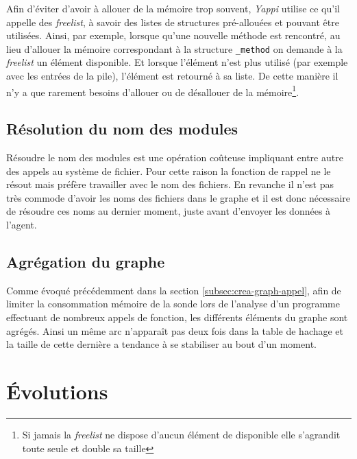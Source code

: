 \begin{note}[freelist]
Afin d'éviter d'avoir à allouer de la mémoire trop souvent, \emph{Yappi} utilise ce qu'il appelle des \emph{freelist}, à savoir des listes de structures pré-allouées et pouvant être utilisées. Ainsi, par exemple, lorsque qu'une nouvelle méthode est rencontré, au lieu d'allouer la mémoire correspondant à la structure \verb|_method| on demande à la \emph{freelist} un élément disponible. Et lorsque l'élément n'est plus utilisé (par exemple avec les entrées de la pile), l'élément est retourné à sa liste. De cette manière il n'y a que rarement besoins d'allouer ou de désallouer de la mémoire\footnote{Si jamais la \emph{freelist} ne dispose d'aucun élément de disponible elle s'agrandit toute seule et double sa taille}.
\end{note}

\subsection{Résolution du nom des modules}
Résoudre le nom des modules est une opération coûteuse impliquant entre autre des appels au système de fichier. Pour cette raison la fonction de rappel ne le résout mais préfère travailler avec le nom des fichiers. En revanche il n'est pas très commode d'avoir les noms des fichiers dans le graphe et il est donc nécessaire de résoudre ces noms au dernier moment, juste avant d'envoyer les données à l'agent.

\subsection{Agrégation du graphe}
Comme évoqué précédemment dans la section \vref{subsec:crea-graph-appel}, afin de limiter la consommation mémoire de la sonde lors de l'analyse d'un programme effectuant de nombreux appels de fonction, les différents éléments du graphe sont agrégés. Ainsi un même arc n’apparaît pas deux fois dans la table de hachage et la taille de cette dernière a tendance à se stabiliser au bout d'un moment.

  \section{Évolutions}
  	
